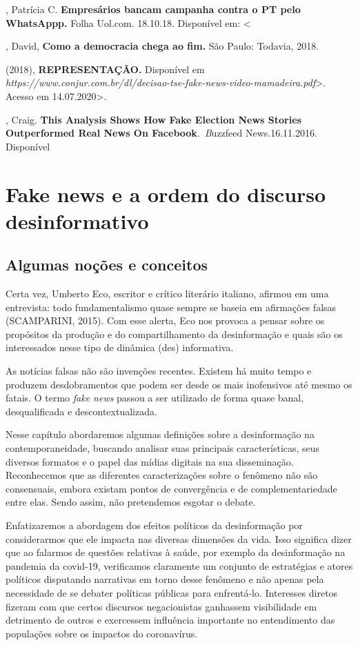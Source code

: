 \begin{bibliohedra}
, Patrícia C. \textbf{Empresários bancam campanha contra o PT pelo
WhatsAppp.} Folha Uol.com. 18.10.18. Disponível em: \textless{}

, David, \textbf{Como a democracia chega ao fim.} São Paulo:
Todavia, 2018.

 (2018), \textbf{REPRESENTAÇÃO.} Disponível
em
\emph{https://www.conjur.com.br/dl/decisao-tse-fake-news-video-mamadeira.pdf}\textgreater{}.
Acesso em 14.07.2020\textgreater{}.

, Craig. \textbf{This Analysis Shows How Fake Election News
Stories Outperformed Real News On Facebook}.~\emph{B}uzzfeed
News.16.11.2016. Disponível
\end{bibliohedra}

\chapter{Fake news e a ordem do discurso desinformativo }

\section{Algumas noções e conceitos}

Certa vez, Umberto Eco, escritor e crítico literário italiano, afirmou
em uma entrevista: todo fundamentalismo quase sempre se baseia em
afirmações falsas (SCAMPARINI, 2015). Com esse alerta, Eco nos provoca a
pensar sobre os propósitos da produção e do compartilhamento da
desinformação e quais são os interessados nesse tipo de dinâmica (des)
informativa.

As notícias falsas não são invenções recentes. Existem há muito tempo e
produzem desdobramentos que podem ser desde os mais inofensivos até
mesmo os fatais. O termo \emph{fake news} passou a ser utilizado de
forma quase banal, desqualificada e descontextualizada.

Nesse capítulo abordaremos algumas definições sobre a desinformação na
contemporaneidade, buscando analisar suas principais características,
seus diversos formatos e o papel das mídias digitais na sua
disseminação. Reconhecemos que as diferentes caracterizações sobre o
fenômeno não são consensuais, embora existam pontos de convergência e de
complementariedade entre elas. Sendo assim, não pretendemos esgotar o
debate.

Enfatizaremos a abordagem dos efeitos políticos da desinformação por
considerarmos que ele impacta nas diversas dimensões da vida. Isso
significa dizer que ao falarmos de questões relativas à saúde, por
exemplo da desinformação na pandemia da covid-19, verificamos claramente
um conjunto de estratégias e atores políticos disputando narrativas em
torno desse fenômeno e não apenas pela necessidade de se debater
políticas públicas para enfrentá-lo. Interesses diretos fizeram com que
certos discursos negacionistas ganhassem visibilidade em detrimento de
outros e exercessem influência importante no entendimento das populações
sobre os impactos do coronavírus.


